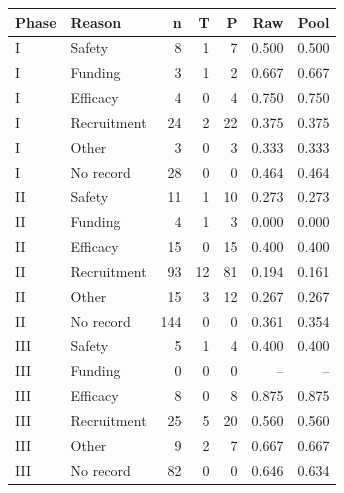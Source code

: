 \begin{tabular}{llrrrrr}
\toprule
Phase & Reason & n & T & P & Raw & Pool \\
\midrule
I & Safety & 8 & 1 & 7 & 0.500 & 0.500 \\
I & Funding & 3 & 1 & 2 & 0.667 & 0.667 \\
I & Efficacy & 4 & 0 & 4 & 0.750 & 0.750 \\
I & Recruitment & 24 & 2 & 22 & 0.375 & 0.375 \\
I & Other & 3 & 0 & 3 & 0.333 & 0.333 \\
I & No record & 28 & 0 & 0 & 0.464 & 0.464 \\
II & Safety & 11 & 1 & 10 & 0.273 & 0.273 \\
II & Funding & 4 & 1 & 3 & 0.000 & 0.000 \\
II & Efficacy & 15 & 0 & 15 & 0.400 & 0.400 \\
II & Recruitment & 93 & 12 & 81 & 0.194 & 0.161 \\
II & Other & 15 & 3 & 12 & 0.267 & 0.267 \\
II & No record & 144 & 0 & 0 & 0.361 & 0.354 \\
III & Safety & 5 & 1 & 4 & 0.400 & 0.400 \\
III & Funding & 0 & 0 & 0 & -- & -- \\
III & Efficacy & 8 & 0 & 8 & 0.875 & 0.875 \\
III & Recruitment & 25 & 5 & 20 & 0.560 & 0.560 \\
III & Other & 9 & 2 & 7 & 0.667 & 0.667 \\
III & No record & 82 & 0 & 0 & 0.646 & 0.634 \\
\bottomrule
\end{tabular}
